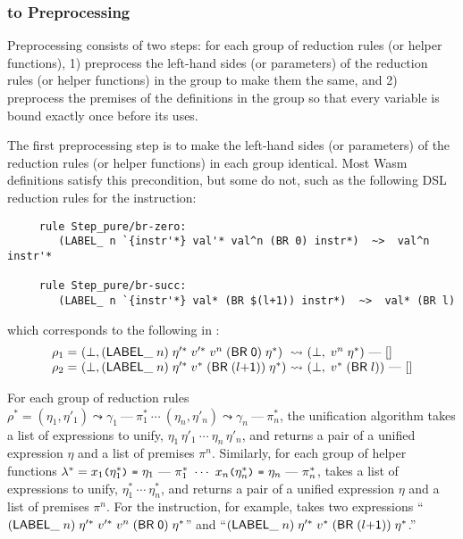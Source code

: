 \subsubsection{\dl to \dl Preprocessing}
Preprocessing consists of two steps: for each group of reduction rules (or helper functions),
1) preprocess the left-hand sides (or parameters) of the reduction rules (or helper functions)
in the group to make them the same, and
2) preprocess the premises of the definitions in the group
so that every variable is bound exactly once before its uses.

\medskip
The first preprocessing step is to make the left-hand sides (or parameters) of
the reduction rules (or helper functions) in each group identical.
Most Wasm  definitions satisfy this precondition, but some do not, such as the following
DSL reduction rules for the  instruction:

{
\begin{verbatim}
     rule Step_pure/br-zero:
        (LABEL_ n `{instr'*} val'* val^n (BR 0) instr*)  ~>  val^n instr'*

     rule Step_pure/br-succ:
        (LABEL_ n `{instr'*} val* (BR $(l+1)) instr*)  ~>  val* (BR l)
\end{verbatim}
}

\noindent
which corresponds to the following in \dl:
\[
\begin{array}{l@{~}l@{~}c@{~}l}
\rho_1 = &(\bot, (\ssf{LABEL\_} \; n) \; \eta'^*\; v'^*\; v^n\; (\ssf{BR\; 0})\; \eta^*) &\leadsto&
 (\bot,\; v^n\; \eta^*)\ \mbox{---}\ []\\
\rho_2 = &(\bot, (\ssf{LABEL\_} \; n) \; \eta'^*\; v^*\; (\ssf{BR\; (}l\ssf{+1)})\; \eta^*) &\leadsto&
 (\bot,\; v^*\; (\ssf{BR}\; l))\ \mbox{---}\ []
\end{array}
\]

For each group of reduction rules $\rho^* =
(\eta_1, \eta' _1) \leadsto \gamma_1\ \mbox{---}\ \pi_1^*\
\cdots\
(\eta_n, \eta' _n) \leadsto \gamma_n\ \mbox{---}\ \pi_n^*$,
the unification algorithm \unify takes a list of expressions to unify,
$\eta_1\,\eta'_1\ \cdots\ \eta_n\,\eta'_n$, and returns a pair of
a unified expression $\eta$ and a list of premises $\pi^n$.
Similarly, for each group of helper functions $\lambda^*=
\varx_1 \kwrl \eta_1^* \kwrr\ \kwequ\ \eta_1\ \mbox{---}\ \pi_1^*\
\cdots\
\varx_n \kwrl \eta_n^* \kwrr\ \kwequ\ \eta_n\ \mbox{---}\ \pi_n^*$,
\unify takes a list of expressions to unify,
$\eta_1^*\ \cdots\ \eta_n^*$, and returns a pair of
a unified expression $\eta$ and a list of premises $\pi^n$.
For the \inblue{\ensuremath{\mathsf{br}}} instruction, for example,
\unify takes two expressions
``{$(\mathsf{LABEL\_} \; n) \; \eta'^*\; v'^*\; v^n\; (\mathsf{BR\; 0})\; \eta^*$}'' and
``{$(\mathsf{LABEL\_} \; n) \; \eta'^*\; v^*\; (\mathsf{BR\; (} l\mathsf{+1)})\; \eta^*$}.''


